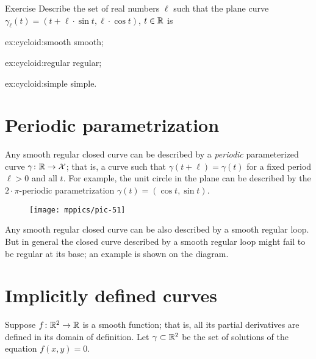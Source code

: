 \begin{thm}{Exercise}\label{ex:cycloid}
Describe the set of real numbers $\ell$
such that the plane curve $\gamma_\ell (t)= (t+\ell \cdot \sin t,\ell \cdot \cos t)$, $t\in\mathbb{R}$ is

\begin{subthm}{ex:cycloid:smooth}
smooth; %
\end{subthm}

\begin{subthm}{ex:cycloid:regular}
regular;
\end{subthm}

\begin{subthm}{ex:cycloid:simple}
simple.
\end{subthm}

\end{thm}

\section{Periodic parametrization}

Any smooth regular closed curve can be described by a \emph{periodic} parameterized curve $\gamma\colon \mathbb{R}\to \mathcal{X}$; that is, a curve such that $\gamma(t+\ell)=\gamma(t)$ for a fixed period $\ell > 0$ and all $t$.
For example, the unit circle in the plane can be described by the $2{\cdot}\pi$-periodic parametrization $\gamma(t)=(\cos t,\sin t)$.

{

\begin{wrapfigure}{o}{17 mm}
\vskip-0mm
\centering
\texttt{[image: mppics/pic-51]}
\end{wrapfigure}

Any smooth regular closed curve can be also described by a smooth regular loop.
But in general the closed curve described by a smooth regular loop might fail to be regular at its base; an example is shown on the diagram.

}

\section{Implicitly defined curves}

Suppose $f\colon\mathbb{R}^2\to \mathbb{R}$ is a smooth function; 
that is, all its partial derivatives are defined in its domain of definition.
Let $\gamma\subset \mathbb{R}^2$ be the set of solutions of the equation $f(x,y)=0$.

